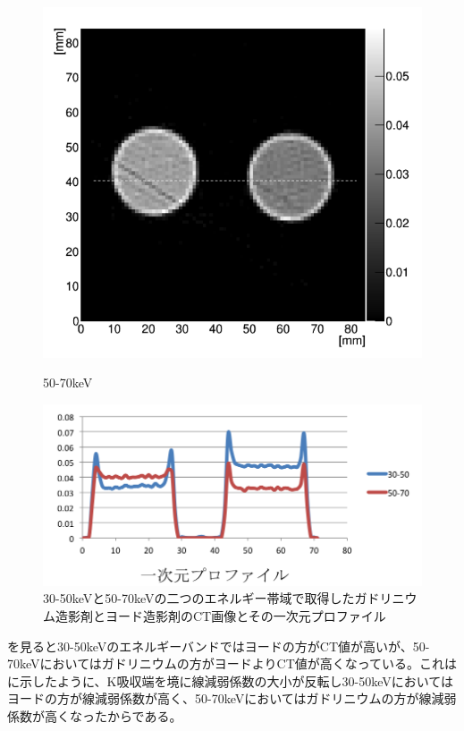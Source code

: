 \begin{figure}[H]
\begin{minipage}{0.5\hsize}
\begin{center}
 \includegraphics[bb=0.000000 0.000000 294.695638 272.137503,width=1\hsize]{image2/chapter5/hanten_50-70.png} 
  \end{center}
    \vspace{-1cm}
  \caption*{50-70keV}
 \end{minipage}
  \begin{minipage}{0.5\hsize}
     \hspace{3.5cm}
 \includegraphics[bb=0.000000 0.000000 411.805957 197.263693,width=1.4\hsize]{image2/chapter5/hanten_profile.png} 
 \end{minipage}
 \begin{center}
  \caption{30-50keVと50-70keVの二つのエネルギー帯域で取得したガドリニウム造影剤とヨード造影剤のCT画像とその一次元プロファイル}
  \label{fig:hanten}
  \end{center}
\end{figure}

を見ると30-50keVのエネルギーバンドではヨードの方がCT値が高いが、50-70keVにおいてはガドリニウムの方がヨードよりCT値が高くなっている。これはに示したように、K吸収端を境に線減弱係数の大小が反転し30-50keVにおいてはヨードの方が線減弱係数が高く、50-70keVにおいてはガドリニウムの方が線減弱係数が高くなったからである。






